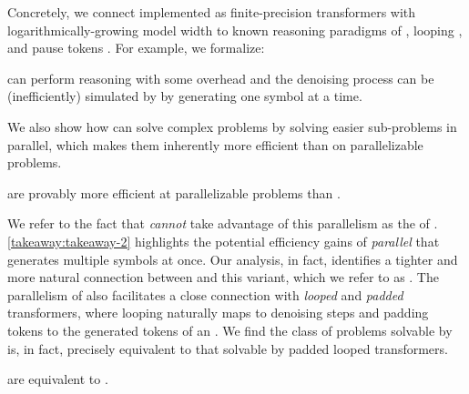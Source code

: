 \documentclass{article} %
\begin{document}
Concretely, we connect \MDMsAcr implemented as finite-precision transformers with logarithmically-growing model width to known reasoning paradigms of \CoTAcr \citep{wei2022chainofthought}, looping \citep{dehghani2019universaltransformers}, and pause tokens \citep{lanham2023measuringfaithfulnesschainofthoughtreasoning}.
For example, we formalize:
\begin{takeaway} \label{takeaway:takeaway-1}
   \MDMsAcr can perform \CoTAcr reasoning with some overhead and the \MDMAcr denoising process can be (inefficiently) simulated by \CoTAcr by generating one symbol at a time.
\end{takeaway}
We also show how \MDMsAcr can solve complex problems by solving easier sub-problems in parallel, which makes them inherently more efficient than \CoTAcr on parallelizable problems.
\begin{takeaway} \label{takeaway:takeaway-2}
   \MDMsAcr are provably more efficient at parallelizable problems than \CoTAcr.
\end{takeaway}
We refer to the fact that \CoTAcr \emph{cannot} take advantage of this parallelism as the  of \CoTAcr.
\cref{takeaway:takeaway-2} highlights the potential efficiency gains of \emph{parallel} \CoTAcr that generates multiple symbols at once.
Our analysis, in fact, identifies a tighter and more natural connection between \MDMsAcr and this variant, which we refer to as \pCoTAcr.
The parallelism of \MDMsAcr also facilitates a close connection with \emph{looped} and \emph{padded} transformers, where looping naturally maps to denoising steps and padding tokens to the generated tokens of an \MDMAcr.
We find the class of problems solvable by \MDMsAcr is, in fact, precisely equivalent to that solvable by padded looped transformers.
\begin{takeaway} \label{takeaway:takeaway-3}
   \MDMsAcr are equivalent to \LTsAcr.
\end{takeaway}
\end{document}
